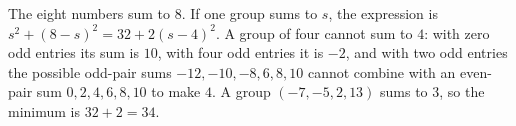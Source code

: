 The eight numbers sum to $8$. If one group sums to $s$, the expression is $s^2+(8-s)^2=32+2(s-4)^2$. A group of four cannot sum to $4$: with zero odd entries its sum is $10$, with four odd entries it is $-2$, and with two odd entries the possible odd-pair sums $-12,-10,-8,6,8,10$ cannot combine with an even-pair sum $0,2,4,6,8,10$ to make $4$. A group $(-7,-5,2,13)$ sums to $3$, so the minimum is $32+2=\boxed{34}$.
